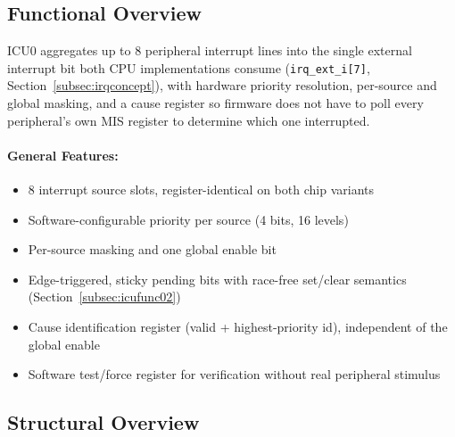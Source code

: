 \subsection{Functional Overview}
\label{subsec:icufunc01}

ICU0 aggregates up to 8 peripheral interrupt lines into the single
external interrupt bit both CPU implementations consume
(\texttt{irq\_ext\_i[7]}, Section~\ref{subsec:irqconcept}), with
hardware priority resolution, per-source and global masking, and a cause
register so firmware does not have to poll every peripheral's own MIS
register to determine which one interrupted.

%

\paragraph{General Features:}
\begin{itemize}
  \item 8 interrupt source slots, register-identical on both chip variants
  \item Software-configurable priority per source (4 bits, 16 levels)
  \item Per-source masking and one global enable bit
  \item Edge-triggered, sticky pending bits with race-free set/clear
    semantics (Section~\ref{subsec:icufunc02})
  \item Cause identification register (valid + highest-priority id),
    independent of the global enable
  \item Software test/force register for verification without real
    peripheral stimulus
\end{itemize}

\subsection{Structural Overview}

